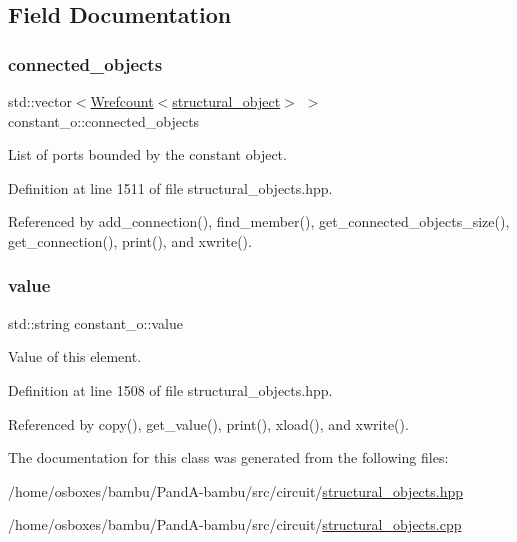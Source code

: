\subsection{Field Documentation}
\mbox{\label{classconstant__o_a668eff51885a21a85d29e12e470f551c}} 
\subsubsection{\texorpdfstring{connected\+\_\+objects}{connected\_objects}}
{\footnotesize\ttfamily std\+::vector$<$\hyperlink{classWrefcount}{Wrefcount}$<$\hyperlink{classstructural__object}{structural\+\_\+object}$>$ $>$ constant\+\_\+o\+::connected\+\_\+objects\hspace{0.3cm}{\ttfamily [private]}}



List of ports bounded by the constant object. 



Definition at line 1511 of file structural\+\_\+objects.\+hpp.



Referenced by add\+\_\+connection(), find\+\_\+member(), get\+\_\+connected\+\_\+objects\+\_\+size(), get\+\_\+connection(), print(), and xwrite().

\mbox{\label{classconstant__o_ab9224c81e6c5783b8db8d68877dc1abe}} 
\subsubsection{\texorpdfstring{value}{value}}
{\footnotesize\ttfamily std\+::string constant\+\_\+o\+::value\hspace{0.3cm}{\ttfamily [private]}}



Value of this element. 



Definition at line 1508 of file structural\+\_\+objects.\+hpp.



Referenced by copy(), get\+\_\+value(), print(), xload(), and xwrite().



The documentation for this class was generated from the following files\+:\begin{DoxyCompactItemize}
\item 
/home/osboxes/bambu/\+Pand\+A-\/bambu/src/circuit/\hyperlink{structural__objects_8hpp}{structural\+\_\+objects.\+hpp}\item 
/home/osboxes/bambu/\+Pand\+A-\/bambu/src/circuit/\hyperlink{structural__objects_8cpp}{structural\+\_\+objects.\+cpp}\end{DoxyCompactItemize}
